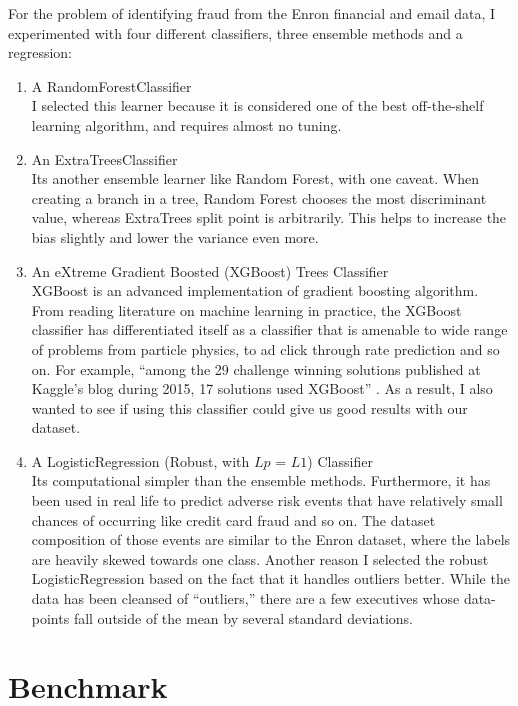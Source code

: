 \documentclass[titlepage,numbers=noenddot,headinclude,%
               footinclude=true,abstractoff,BCOR=5mm,%
               paper=a4,fontsize=11pt,ngerman,american]{scrreprt}
\numberwithin{theorem}{chapter}
\numberwithin{definition}{chapter}
\numberwithin{algorithm}{chapter}
\numberwithin{figure}{chapter}
\numberwithin{table}{chapter}
\numberwithin{equation}{chapter}
\begin{document}
For the problem of identifying fraud from the Enron financial and email data, I experimented with four different classifiers, three ensemble methods and a regression:
\begin{enumerate}%
\item A RandomForestClassifier\\
I selected this learner because it is considered one of the best off-the-shelf learning algorithm, and requires almost no tuning.
\item An ExtraTreesClassifier\\
 Its another ensemble learner like Random Forest, with one caveat. When creating a branch in a tree, Random Forest chooses the most discriminant value, whereas ExtraTrees split point is arbitrarily. This helps to increase the bias slightly and lower the variance even more.
\item An eXtreme Gradient Boosted (XGBoost) Trees Classifier\\
XGBoost is an advanced implementation of gradient boosting algorithm. From reading literature on machine learning in practice, the XGBoost classifier has differentiated itself as a classifier that is amenable to wide range of problems from particle physics, to ad click through rate prediction and so on. For example, ``among the 29 challenge winning solutions published at Kaggle's
blog during 2015, 17 solutions used XGBoost'' \cite{ChenG16}. As a result, I also wanted to see if using this classifier could give us good results with our dataset.

\item A LogisticRegression (Robust, with $Lp$ = $L1$) Classifier\\
Its computational simpler than the ensemble methods. Furthermore, it has been used in real life to predict adverse risk events that have relatively small chances of occurring like credit card fraud and so on. The dataset composition of those events are similar to the Enron dataset, where the labels are heavily skewed towards one class. Another reason I selected the robust LogisticRegression based on the fact that it handles outliers better. While the data has been cleansed of ``outliers,'' there are a few executives whose data-points fall outside of the mean by several standard deviations.

\end{enumerate}



\section*{Benchmark}
\end{document}
